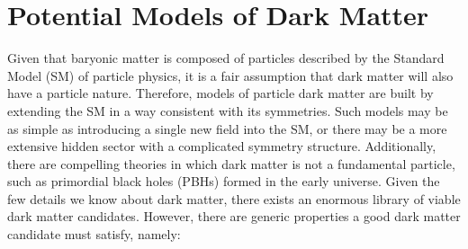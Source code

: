 \section{Potential Models of Dark Matter}

Given that baryonic matter is composed of particles described by the Standard Model (SM) of particle physics, it is a fair assumption that dark matter will also have a particle nature. Therefore, models of particle dark matter are built by extending the SM in a way consistent with its symmetries. 
Such models may be as simple as introducing a single new field into the SM, or there may be a more extensive hidden sector with a complicated symmetry structure. Additionally, there are compelling theories in which dark matter is not a fundamental particle, such as primordial black holes (PBHs) formed in the early universe. Given the few details we know about dark matter, there exists an enormous library of viable dark matter candidates. However, there are generic properties a good dark matter candidate must satisfy, namely:
